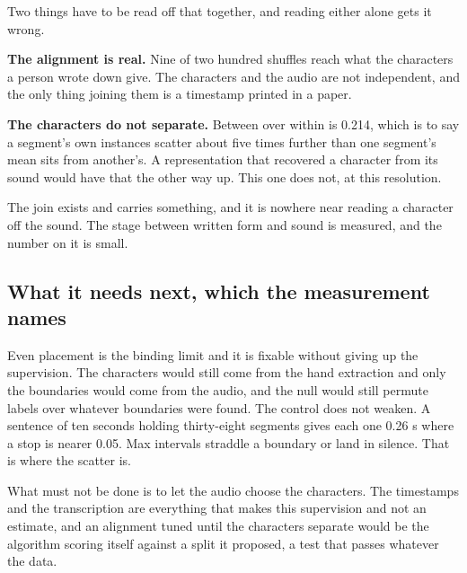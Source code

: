 Two things have to be read off that together, and reading either alone gets it wrong.

\textbf{The alignment is real.} Nine of two hundred shuffles reach what the characters a person wrote
down give. The characters and the audio are not independent, and the only thing joining them is a
timestamp printed in a paper.

\textbf{The characters do not separate.} Between over within is 0.214, which is to say a segment's own
instances scatter about five times further than one segment's mean sits from another's. A
representation that recovered a character from its sound would have that the other way up. This one does
not, at this resolution.

The join exists and carries something, and it is nowhere near reading a character off the sound. The
stage between written form and sound is measured, and the number on it is small.

\subsection{What it needs next, which the measurement names}

Even placement is the binding limit and it is fixable without giving up the supervision. The characters
would still come from the hand extraction and only the boundaries would come from the audio, and the
null would still permute labels over whatever boundaries were found. The control does not weaken. A
sentence of ten seconds holding thirty-eight segments gives each one 0.26 s where a stop is nearer
0.05. Max intervals straddle a boundary or land in silence. That is where the scatter is.

What must not be done is to let the audio choose the characters. The timestamps and the transcription are
everything that makes this supervision and not an estimate, and an alignment tuned until the characters
separate would be the algorithm scoring itself against a split it proposed, a test that passes
whatever the data.
